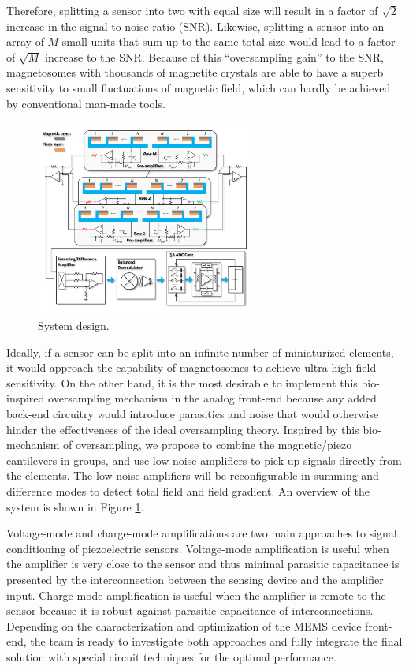 Therefore, splitting a sensor into two with equal size will result in a factor of $\sqrt{2}$ increase in the signal-to-noise ratio (SNR). Likewise, splitting a sensor into an array of $M$ small units that sum up to the same total size would lead to a factor of $\sqrt{M}$ increase to the SNR. Because of this “oversampling gain” to the SNR, magnetosomes with thousands of magnetite crystals are able to have a superb sensitivity to small fluctuations of magnetic field, which can hardly be achieved by conventional man-made tools. 

\begin{figure}
\centering
\includegraphics[width=0.65\textwidth]{System}
\caption{System design.}
\label{fig:system}
\end{figure}

Ideally, if a sensor can be split into an infinite number of miniaturized elements, it would approach the capability of magnetosomes to achieve ultra-high field sensitivity. On the other hand, it is the most desirable to implement this bio-inspired oversampling mechanism in the analog front-end because any added back-end circuitry would introduce parasitics and noise that would otherwise hinder the effectiveness of the ideal oversampling theory. Inspired by this bio-mechanism of oversampling, we propose to combine the magnetic/piezo cantilevers in groups, and use low-noise amplifiers to pick up signals directly from the elements. The low-noise amplifiers will be reconfigurable in summing and difference modes to detect total field and field gradient. An overview of the system is shown in Figure \ref{fig:system}.

Voltage-mode and charge-mode amplifications are two main approaches to signal conditioning of piezoelectric sensors. Voltage-mode amplification is useful when the amplifier is very close to the sensor and thus minimal parasitic capacitance is presented by the interconnection between the sensing device and the amplifier input. Charge-mode amplification is useful when the amplifier is remote to the sensor because it is robust against parasitic capacitance of interconnections. Depending on the characterization and optimization of the MEMS device front-end, the team is ready to investigate both approaches and fully integrate the final solution with special circuit techniques for the optimal performance. 

